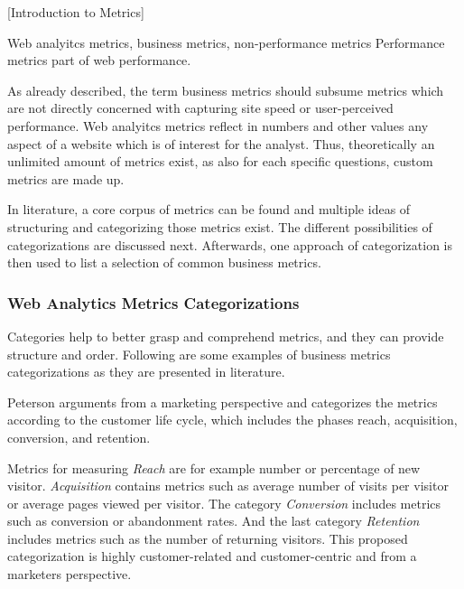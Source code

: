 [Introduction to Metrics]

Web analyitcs metrics, business metrics, non-performance metrics
Performance metrics part of web performance.


As already described, the term business metrics should subsume metrics which are not directly concerned with capturing site speed or user-perceived performance.
Web analyitcs metrics reflect in numbers and other values any aspect of a website which is of interest for the analyst.
Thus, theoretically an unlimited amount of metrics exist, as also for each specific questions, custom metrics are made up.

In literature, a core corpus of metrics can be found and multiple ideas of structuring and categorizing those metrics exist.
The different possibilities of categorizations are discussed next.
Afterwards, one approach of categorization is then used to list a selection of common business metrics.






\subsubsection{Web Analytics Metrics Categorizations}


Categories help to better grasp and comprehend metrics, and they can provide structure and order.
Following are some examples of business metrics categorizations as they are presented in literature.

Peterson arguments from a marketing perspective and categorizes the metrics according to the customer life cycle, which includes the phases reach, acquisition, conversion, and retention. %

Metrics for measuring \textit{Reach} are for example number or percentage of new visitor.
\textit{Acquisition} contains metrics such as average number of visits per visitor or average pages viewed per visitor.
The category \textit{Conversion} includes metrics such as conversion or abandonment rates.
And the last category \textit{Retention} includes metrics such as the number of returning visitors.
This proposed categorization is highly customer-related and customer-centric and from a marketers perspective. 

  
